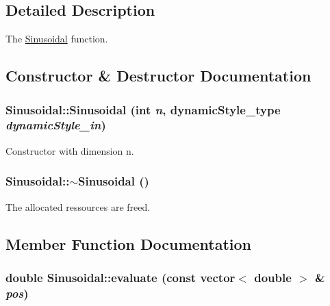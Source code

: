 \subsection{Detailed Description}
The \hyperlink{classSinusoidal}{Sinusoidal} function. 

\subsection{Constructor \& Destructor Documentation}
\hypertarget{classSinusoidal_1b6ef5c12c0aba15f4a178b388ccd836}{
\subsubsection{\setlength{\rightskip}{0pt plus 5cm}Sinusoidal::Sinusoidal (int {\em n}, \/  {\bf dynamicStyle\_\-type} {\em dynamicStyle\_\-in})}}
\label{classSinusoidal_1b6ef5c12c0aba15f4a178b388ccd836}


Constructor with dimension n. 

\hypertarget{classSinusoidal_37f06e31c420a07fce3ee0b7737b40f1}{
\subsubsection{\setlength{\rightskip}{0pt plus 5cm}Sinusoidal::$\sim$Sinusoidal ()}}
\label{classSinusoidal_37f06e31c420a07fce3ee0b7737b40f1}


The allocated ressources are freed. 



\subsection{Member Function Documentation}
\hypertarget{classSinusoidal_ebf69635314532d341503d97b09e7c39}{
\subsubsection{\setlength{\rightskip}{0pt plus 5cm}double Sinusoidal::evaluate (const vector$<$ double $>$ \& {\em pos})}}
\label{classSinusoidal_ebf69635314532d341503d97b09e7c39}


